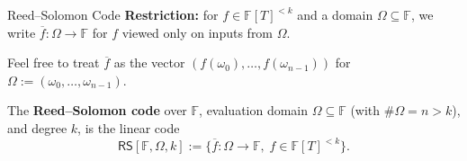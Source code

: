 \documentclass{zkdl-presentation-template}
\begin{document}
    \begin{frame}{Reed--Solomon Code}
        \textbf{Restriction:} for $f \in \mathbb{F}[T]^{<k}$ and a domain $\Omega \subseteq \mathbb{F}$, we write $\overline{f}: \Omega \to \mathbb{F}$ for $f$ viewed only on inputs from $\Omega$.

        \begin{remark}
            Feel free to treat $\overline{f}$ as the vector $(f(\omega_0),\dots,f(\omega_{n-1}))$ for $\Omega := (\omega_0,\dots,\omega_{n-1})$.
        \end{remark}
        \pause

        \begin{definition}
            The \textbf{Reed--Solomon code} over $\mathbb{F}$, evaluation domain $\Omega \subseteq \mathbb{F}$ (with $\#\Omega = n > k$), and degree $k$, is the linear code
            \begin{equation*}
                \mathsf{RS}[\mathbb{F},\Omega,k] := \{\overline{f}: \Omega \to \mathbb{F}, \; f \in \mathbb{F}[T]^{<k}\}.
            \end{equation*}
        \end{definition}
    \end{frame}
\end{document}
